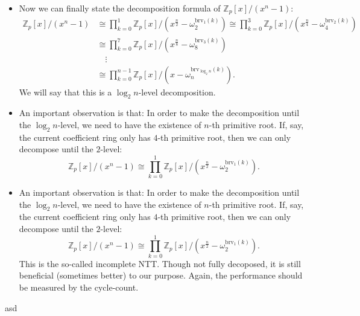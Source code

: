 \begin{frame}
    \begin{itemize}
        \item <1->Now we can finally state the decomposition formula of \( \mathbb{Z}_{p}[x]/(x^{n}-1) \):
            \begin{align*}
                \mathbb{Z}_{p}[x]/(x^{n}-1) 
                & \cong \prod_{k=0}^{1} \mathbb{Z}_{p}[x]/(x^{\frac{n}{2}}-\omega_{2}^{\mathrm{brv}_{1}(k)})
                 \cong \prod_{k=0}^{3} \mathbb{Z}_{p}[x]/(x^{\frac{n}{4}}-\omega_{4}^{\mathrm{brv}_{2}(k)})\\
                & \cong \prod_{k=0}^{7} \mathbb{Z}_{p}[x]/(x^{\frac{n}{8}}-\omega_{8}^{\mathrm{brv}_{3}(k)})\\
                & \quad \vdots\\
                & \cong \prod_{k=0}^{n-1} \mathbb{Z}_{p}[x]/(x-\omega_{n}^{\mathrm{brv}_{\log_{2}n}(k)}).
            \end{align*}
            We will say that this is a \( \log_{2}n \)-level decomposition.
        \item <2->An important observation is that:
        In order to make the decomposition until the \( \log_{2}n \)-level, we need to have the existence of \( n \)-th primitive root.
        If, say, the current coefficient ring only has \( 4 \)-th primitive root, then we can only decompose until the \( 2 \)-level:
        \[
            \mathbb{Z}_{p}[x]/(x^{n}-1) 
            \cong \prod_{k=0}^{1} \mathbb{Z}_{p}[x]/(x^{\frac{n}{2}}-\omega_{2}^{\mathrm{brv}_{1}(k)}).
        \]
    \end{itemize}
\end{frame}

\begin{frame}
    \begin{itemize}
        \item An important observation is that:
        In order to make the decomposition until the \( \log_{2}n \)-level, we need to have the existence of \( n \)-th primitive root.
        If, say, the current coefficient ring only has \( 4 \)-th primitive root, then we can only decompose until the \( 2 \)-level:
        \[
            \mathbb{Z}_{p}[x]/(x^{n}-1) 
            \cong \prod_{k=0}^{1} \mathbb{Z}_{p}[x]/(x^{\frac{n}{2}}-\omega_{2}^{\mathrm{brv}_{1}(k)}).
        \]
        This is the so-called incomplete NTT. 
        Though not fully decoposed, it is still beneficial (sometimes better) to our purpose.
        Again, the performance should be measured by the cycle-count.
    \end{itemize}
\end{frame}






\begin{frame}
asd    
\end{frame}
